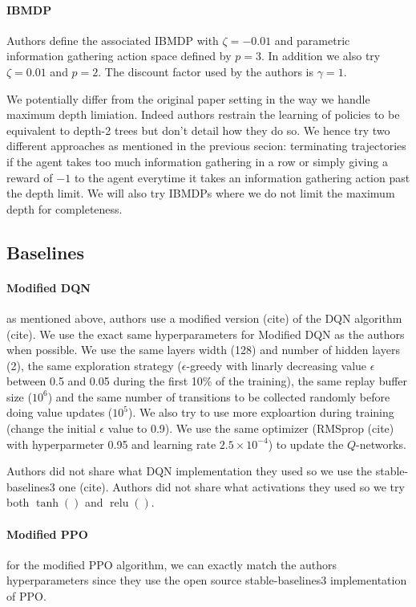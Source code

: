 \paragraph{IBMDP} Authors define the associated IBMDP with $\zeta=-0.01$ and parametric information gathering action space defined by $p=3$.
In addition we also try $\zeta=0.01$ and $p=2$.
The discount factor used by the authors is $\gamma=1$.

We potentially differ from the original paper setting in the way we handle maximum depth limiation. 
Indeed authors restrain the learning of policies to be equivalent to depth-2 trees but don't detail how they do so.
We hence try two different approaches as mentioned in the previous secion: terminating trajectories if the agent takes too much information gathering in a row or simply giving a reward of $-1$ to the agent everytime it takes an information gathering action past the depth limit.
We will also try IBMDPs where we do not limit the maximum depth for completeness.

\subsection{Baselines}
\paragraph{Modified DQN} as mentioned above, authors use a modified version (cite) of the DQN algorithm (cite).
We use the exact same hyperparameters for Modified DQN as the authors when possible. 
We use the same layers width (128) and number of hidden layers (2), the same exploration strategy ($\epsilon$-greedy with linarly decreasing value $\epsilon$ between 0.5 and 0.05 during the first 10\% of the training),
the same replay buffer size ($10^6$) and the same number of transitions to be collected randomly before doing value updates ($10^5$).
We also try to use more exploartion during training (change the initial $\epsilon$ value to 0.9).
We use the same optimizer (RMSprop (cite) with hyperparmeter 0.95 and learning rate $2.5 \times 10^{-4}$) to update the $Q$-networks.

Authors did not share what DQN implementation they used so we use the stable-baselines3 one (cite).
Authors did not share what activations they used so we try both $\operatorname{tanh}()$ and $\operatorname{relu}()$. 

\paragraph{Modified PPO} for the modified PPO algorithm, we can exactly match the authors hyperparameters since they use the open source stable-baselines3 implementation of PPO.

